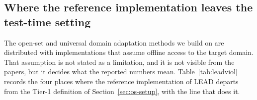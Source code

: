 \subsection{Where the reference implementation leaves the test-time setting}
\label{sec:os-lead}

The open-set and universal domain adaptation methods we build on are distributed with
implementations that assume offline access to the target domain. That assumption is not
stated as a limitation, and it is not visible from the papers, but it decides what the
reported numbers mean. Table~\ref{tab:leadviol} records the four places where the
reference implementation of LEAD \cite{lead} departs from the Tier-1 definition of
Section~\ref{sec:os-setup}, with the line that does it.

